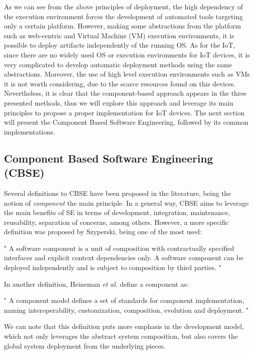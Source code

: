As we can see from the above principles of deployment, the high dependency of the execution environment forces the development of automated tools targeting only a certain platform.
However, making some abstractions from the platform such as web-centric and Virtual Machine (VM) execution environments, it is possible to deploy artifacts independently of the running OS.
As for the IoT, since there are no widely used OS or execution environments for IoT devices, it is very complicated to develop automatic deployment methods using the same abstractions.
Moreover, the use of high level execution environments such as VMs it is not worth considering, due to the scarce resources found on this devices.
Nevertheless, it is clear that the component-based approach appears in the three presented methods, thus we will explore this approach and leverage its main principles to propose a proper implementation for IoT devices.
The next section will present the Component Based Software Engineering, followed by its common implementations.


\subsection{Component Based Software Engineering (CBSE)}
\label{sec:CBSE}
Several definitions to CBSE have been proposed in the literature, being the notion of \textit{component} the main principle.
In a general way, CBSE aims to leverage the main benefits of SE in terms of development, integration, maintenance, reusability, separation of concerns, among others.
However, a more specific definition was proposed by Szyperski\cite{szyperski2002component}, being one of the most used:
\begin{citeverbatim}
	" A software component is a unit of composition with contractually specified interfaces and explicit context dependencies only. A software component can be deployed independently and is subject to composition by third parties. "
\end{citeverbatim}
In another definition, Heineman \textit{et al.}\cite{heineman2001cbse} define a component as:
\begin{citeverbatim}
	" A component model defines a set of standards for component implementation, naming interoperability, customization, composition, evolution and deployment. "
\end{citeverbatim}
We can note that this definition puts more emphasis in the development model, which not only leverages the abstract system composition, but also covers the global system deployment from the underlying pieces.

